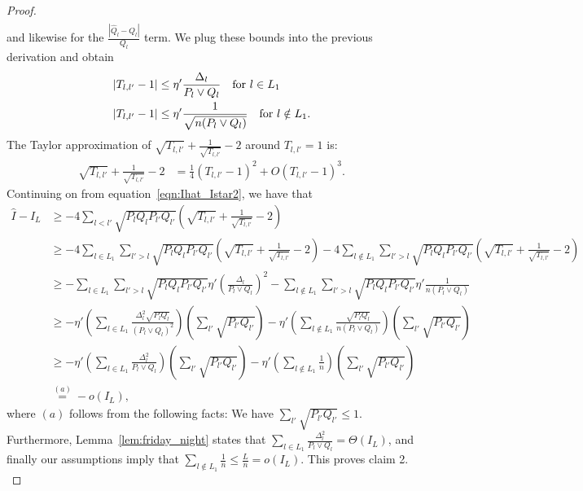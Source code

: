 \documentclass{article}
\begin{document}
\begin{proof}
\begin{align*}
\end{align*}
and likewise for the $\frac{|\hat{Q}_l - Q_l|}{Q_l}$ term. We plug these bounds into the previous derivation and obtain
\begin{align*}
|T_{l,l'} - 1|  &\leq \eta'  \frac{\Delta_l}{P_l \vee Q_l}  \quad \textrm{for $l \in L_1$}\\
|T_{l,l'} - 1 | &\leq \eta' \frac{1}{\sqrt{ n (P_l \vee Q_l)}} \quad \textrm{for $l \notin L_1$}.
\end{align*}
The Taylor approximation of $\sqrt{T_{l,l'}} + \frac{1}{\sqrt{T_{l,l'}}} - 2$ around $T_{l,l'}=1$ is:
\begin{align*}
\sqrt{T_{l,l'}} + \frac{1}{\sqrt{T_{l,l'}}} -2  &= 
  \frac{1}{4} (T_{l,l'} - 1)^2 + O (T_{l,l'}-1)^3. 
\end{align*}
Continuing on from equation~\ref{eqn:Ihat_Istar2}, we have that
\begin{align*}
\hat{I} - I_L &\geq - 4 \sum_{l < l'} \sqrt{P_l Q_l P_{l'} Q_{l'}} 
    \left( \sqrt{T_{l,l'}} + \frac{1}{\sqrt{T_{l,l'}}} - 2 \right) \\
&\geq - 4 \sum_{l \in L_1} \sum_{l' > l} \sqrt{P_l Q_l P_{l'} Q_{l'}} 
    \left( \sqrt{T_{l,l'}} + \frac{1}{\sqrt{T_{l,l'}}} - 2 \right) 
     - 4 \sum_{l \notin L_1} \sum_{l' > l} \sqrt{P_l Q_l P_{l'} Q_{l'}} 
    \left( \sqrt{T_{l,l'}} + \frac{1}{\sqrt{T_{l,l'}}} - 2 \right) \\
  &\geq - \sum_{l \in L_1} \sum_{l' > l} \sqrt{P_l Q_l P_{l'} Q_{l'}} 
             \eta' \left( \frac{\Delta_l}{P_l \vee Q_l}  \right)^2 
        - \sum_{l \notin L_1} \sum_{l' > l} \sqrt{P_l Q_l P_{l'} Q_{l'}} 
             \eta' \frac{1}{n (P_l \vee Q_l)} \\
&\geq - \eta' \left( \sum_{l \in L_1} \frac{\Delta_l^2 \sqrt{P_l Q_l}}{(P_l \vee Q_l)^2} \right)
 	\left( \sum_{l'}  \sqrt{P_{l'}Q_{l'}} \right) 
	- \eta' \left( \sum_{l \notin L_1} \frac{\sqrt{P_lQ_l}}{n(P_l \vee Q_l)} \right) 
          \left( \sum_{l'} \sqrt{P_{l'} Q_{l'} } \right) \\
 &\geq - \eta' \left( \sum_{l \in L_1} \frac{\Delta_l^2}{P_l \vee Q_l} \right)
         \left( \sum_{l'}  \sqrt{P_{l'}Q_{l'}} \right) 
       - \eta' \left( \sum_{l \notin L_1} \frac{1}{n} \right) 
          \left( \sum_{l'} \sqrt{P_{l'} Q_{l'} } \right) \\
 &\stackrel{(a)}=  -o(I_L),
\end{align*}
where $(a)$ follows from the following facts: We have $\sum_{l'} \sqrt{P_{l'} Q_{l'}} \leq 1$. Furthermore, Lemma~\ref{lem:friday_night} states that $\sum_{l \in L_1} \frac{\Delta_l^2}{P_l \vee Q_l} = \Theta(I_L)$, and finally our assumptions imply that  $\sum_{l \notin L_1} \frac{1}{n} \leq \frac{L}{n} = o(I_L)$. This proves claim 2.\\


\end{proof}
\end{document}
